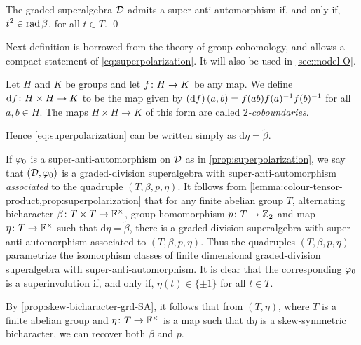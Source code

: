 \begin{cor}\label{cor:super-anti-auto-squares-in-radical}
    The graded-superalgebra $\mathcal{D}$ admits a super-anti-automorphism if, and only if, 
    $t^2\in \operatorname{rad}\tilde\beta$, for all $t \in T$. \qed
\end{cor}

Next definition is borrowed from the theory of group cohomology, and allows a compact statement of \cref{eq:superpolarization}. 
It will also be used in \cref{sec:model-O}.


\begin{defi}\label{def:coboundary}
	Let $H$ and $K$ be groups and let $f\colon H \to K$ be any map.
	We define $\mathrm{d} f\colon H\times H \to K$ to be the map given by $(\mathrm{d} f)\, (a,b) = f(ab)f(a)^{-1} f(b)^{-1}$ for all $a,b \in H$.
	The maps $H\times H \to K$ of this form are called \emph{$2$-coboundaries}.
\end{defi}


Hence \cref{eq:superpolarization} can be written simply as $\mathrm{d}\eta = \tilde\beta.$

If $\varphi_0$ is a super-anti-automorphism on $\mathcal{D}$ as in \cref{prop:superpolarization}, we say that
$(\mathcal{D},\varphi_0)$ is a graded-division superalgebra with super-anti-automorphism \emph{associated} to the quadruple $(T, \beta, p, \eta)$. 
It follows from \cref{lemma:colour-tensor-product,prop:superpolarization} that for any finite abelian group $T$, alternating bicharacter $\beta\colon T\times T \to \mathbb{F}^\times$, group homomorphism $p\colon T \to \mathbb{Z}_2$ and map $\eta\colon T \to \mathbb{F}^\times$ such that $\mathrm{d}\eta = \tilde\beta$, there is a graded-division superalgebra with super-anti-automorphism associated to $(T, \beta, p, \eta)$. 
Thus the quadruples $(T, \beta, p, \eta)$ parametrize the isomorphism classes of finite dimensional graded-division superalgebra with super-anti-automorphism. 
It is clear that the corresponding $\varphi_0$ is a superinvolution if, and only if, $\eta(t) \in \{ \pm 1 \}$ for all $t\in T$. 

\begin{remark}
    By \cref{prop:skew-bicharacter-grd-SA}, it follows that from $(T, \eta)$, where $T$ is a finite abelian group and $\eta\colon T \to \mathbb{F}^\times$ is a map such that $\mathrm{d}\eta$ is a skew-symmetric bicharacter, we can recover both $\beta$ and $p$. 
\end{remark}

